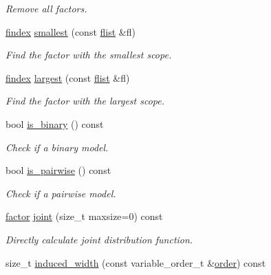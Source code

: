 \begin{DoxyCompactItemize}
\begin{DoxyCompactList}\small\item\em Remove all factors. \end{DoxyCompactList}\item 
\hyperlink{classmerlin_1_1graphical__model_ab2b46f09d8142bb68f243ecadbdabb6b}{findex} \hyperlink{classmerlin_1_1graphical__model_a87052337ee867285fc2700d00995cc1e}{smallest} (const \hyperlink{classmerlin_1_1graphical__model_a615e25ec6594615fddfd4c3c4776b99f}{flist} \&fl)
\begin{DoxyCompactList}\small\item\em Find the factor with the smallest scope. \end{DoxyCompactList}\item 
\hyperlink{classmerlin_1_1graphical__model_ab2b46f09d8142bb68f243ecadbdabb6b}{findex} \hyperlink{classmerlin_1_1graphical__model_abe468de8ee79157ccfd329dae24fa221}{largest} (const \hyperlink{classmerlin_1_1graphical__model_a615e25ec6594615fddfd4c3c4776b99f}{flist} \&fl)
\begin{DoxyCompactList}\small\item\em Find the factor with the largest scope. \end{DoxyCompactList}\item 
bool \hyperlink{classmerlin_1_1graphical__model_ab898aaf86745e1a842aa9784cd91f86c}{is\+\_\+binary} () const 
\begin{DoxyCompactList}\small\item\em Check if a binary model. \end{DoxyCompactList}\item 
bool \hyperlink{classmerlin_1_1graphical__model_ace118985e3679cdacfc5332947dfb444}{is\+\_\+pairwise} () const 
\begin{DoxyCompactList}\small\item\em Check if a pairwise model. \end{DoxyCompactList}\item 
\hyperlink{classmerlin_1_1factor}{factor} \hyperlink{classmerlin_1_1graphical__model_a7b3e5d2e0b423e481019f224971e0d29}{joint} (size\+\_\+t maxsize=0) const 
\begin{DoxyCompactList}\small\item\em Directly calculate joint distribution function. \end{DoxyCompactList}\item 
size\+\_\+t \hyperlink{classmerlin_1_1graphical__model_a109e5f71e08368d3460ab4a74e1074fb}{induced\+\_\+width} (const variable\+\_\+order\+\_\+t \&\hyperlink{classmerlin_1_1graphical__model_a90bcf3fb02f0f43bf57520e834875c78}{order}) const 

\end{DoxyCompactItemize}
